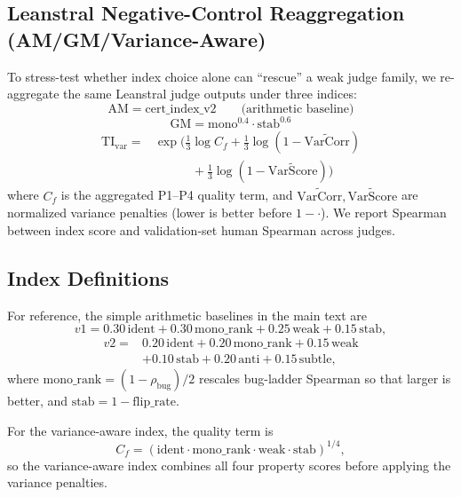 \documentclass{article}
\begin{document}
\subsection{Leanstral Negative-Control Reaggregation (AM/GM/Variance-Aware)}
To stress-test whether index choice alone can ``rescue'' a weak judge family, we re-aggregate the same Leanstral judge outputs under three indices:
\[
  \mathrm{AM}=\text{cert\_index\_v2}
  \qquad \text{(arithmetic baseline)}
\]
\[
  \mathrm{GM}=\mathrm{mono}^{0.4}\cdot \mathrm{stab}^{0.6}
\]
\[
  \begin{aligned}
    \mathrm{TI}_{\mathrm{var}}
    ={} & \exp\!\Big(
    \tfrac{1}{3}\log C_f
    + \tfrac{1}{3}\log(1-\widetilde{\mathrm{VarCorr}}) \\
        & \qquad\quad
    + \tfrac{1}{3}\log(1-\widetilde{\mathrm{VarScore}})
    \Big)
  \end{aligned}
\]
where \(C_f\) is the aggregated P1--P4 quality term, and \(\widetilde{\mathrm{VarCorr}},\widetilde{\mathrm{VarScore}}\) are normalized variance penalties (lower is better before \(1-\cdot\)).
We report Spearman between index score and validation-set human Spearman across judges.

\subsection{Index Definitions}\label{app:index-definitions}
For reference, the simple arithmetic baselines in the main text are
\[
  v1 = 0.30\,\text{ident} + 0.30\,\text{mono\_rank} + 0.25\,\text{weak} + 0.15\,\text{stab},
\]
\[
  \begin{aligned}
    v2 ={} & 0.20\,\text{ident} + 0.20\,\text{mono\_rank} + 0.15\,\text{weak} \\
           & + 0.10\,\text{stab} + 0.20\,\text{anti} + 0.15\,\text{subtle},
  \end{aligned}
\]
where \(\text{mono\_rank}=(1-\rho_{\text{bug}})/2\) rescales bug-ladder Spearman so that larger is better, and \(\text{stab}=1-\text{flip\_rate}\).

For the variance-aware index, the quality term is
\[
  C_f = \left(\text{ident}\cdot\text{mono\_rank}\cdot\text{weak}\cdot\text{stab}\right)^{1/4},
\]
so the variance-aware index combines all four property scores before applying the variance penalties.
\end{document}
